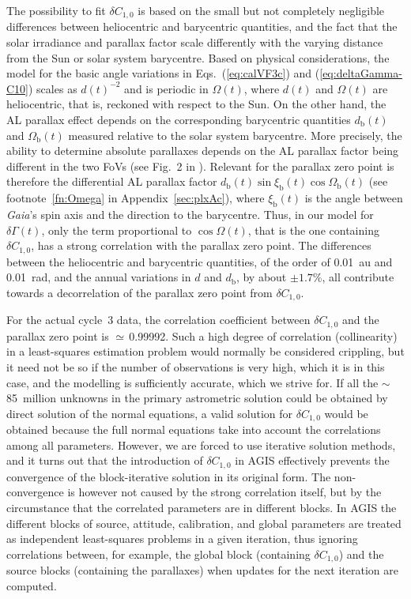 \documentclass[longauth]{aa} %
\begin{document}
The possibility to fit $\delta C_{1,0}$ 
is based on the small but not completely negligible differences between
heliocentric and barycentric quantities, and the fact that the solar irradiance and parallax
factor scale differently with the varying distance from the Sun or solar system barycentre.
Based on physical considerations, the model for the basic angle variations in 
Eqs.~(\ref{eq:calVF3c}) and (\ref{eq:deltaGamma-C10}) scales as $d(t)^{-2}$ and is
periodic in $\Omega(t)$, where $d(t)$ and $\Omega(t)$ are heliocentric, that is, reckoned 
with respect to the Sun. On the other hand, the AL parallax effect depends on the 
corresponding barycentric quantities $d_\text{b}(t)$ and $\Omega_\text{b}(t)$ measured
relative to the solar system barycentre. More precisely, 
the ability to determine absolute parallaxes depends on the AL parallax 
factor being different in the two FoVs (see Fig.~2 in ). 
Relevant for the parallax zero point is therefore the 
differential AL parallax factor $d_\text{b}(t)\sin\xi_\text{b}(t)\cos\Omega_\text{b}(t)$
(see footnote~\ref{fn:Omega} in Appendix~\ref{sec:plxAc}), where $\xi_\text{b}(t)$ 
is the angle between \textit{Gaia}'s spin axis and the direction to the barycentre.
Thus, in our model for $\delta\Gamma(t)$, only the term proportional to 
$\cos\Omega(t)$, that is the one containing $\delta C_{1,0}$, has a strong 
correlation with the parallax zero point.
The differences between the heliocentric and barycentric 
quantities, of the order of 0.01~au and 0.01~rad, and the annual variations in
$d$ and $d_\text{b}$, by about $\pm 1.7$\%, all contribute 
towards a decorrelation of the parallax zero point from $\delta C_{1,0}$. 

For the actual cycle~3 data, the correlation coefficient between $\delta C_{1,0}$ 
and the parallax zero point is $\simeq\,$0.99992. Such a high degree of correlation 
(collinearity) in a least-squares estimation problem would normally be considered 
crippling, but it need not be so if the number of observations is very high, which it is 
in this case, and the modelling is sufficiently accurate, which we strive for. 
If all the $\sim$85~million unknowns in the primary astrometric solution could be 
obtained by direct solution of the normal equations, a valid solution for $\delta C_{1,0}$ 
would be obtained because the full normal equations take 
into account the correlations among all parameters. However, we are forced to 
use iterative solution methods, and it turns out that the introduction of $\delta C_{1,0}$ 
in AGIS effectively prevents the convergence of the block-iterative solution in its
original form. The non-convergence is however not caused by the strong correlation 
itself, but by the circumstance that the correlated parameters are in different blocks.
In AGIS the different blocks of source, attitude, calibration, and global parameters are 
treated as independent least-squares problems in a given iteration, thus ignoring 
correlations between, for example, the global block (containing $\delta C_{1,0}$)
and the source blocks (containing the parallaxes) when updates for the next iteration 
are computed.
\end{document}
